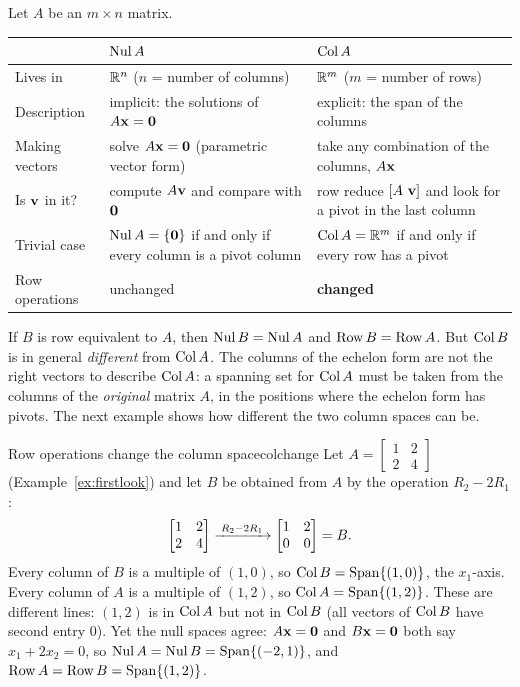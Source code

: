 \documentclass[11pt]{article}
\begin{document}
\begin{remark}
Let $A$ be an $m\times n$ matrix.

\begin{center}
\begin{tabular}{p{1.1in}p{2.2in}p{2.2in}}
\toprule
 & $\operatorname{Nul} A$ & $\operatorname{Col} A$\\
\midrule
Lives in & $\mathbb{R}^n$ ($n$ = number of columns) & $\mathbb{R}^m$ ($m$ = number of rows)\\
Description & implicit: the solutions of $A\mathbf{x}=\mathbf{0}$ & explicit: the span of the columns\\
Making vectors & solve $A\mathbf{x}=\mathbf{0}$ (parametric vector form) & take any combination of the columns, $A\mathbf{x}$\\
Is $\mathbf{v}$ in it? & compute $A\mathbf{v}$ and compare with $\mathbf{0}$ & row reduce $[A\ \bv{v}]$ and look for a pivot in the last column\\
Trivial case & $\operatorname{Nul} A=\{\mathbf{0}\}$ if and only if every column is a pivot column & $\operatorname{Col} A=\mathbb{R}^m$ if and only if every row has a pivot\\
Row operations & unchanged & \textbf{changed}\\
\bottomrule
\end{tabular}
\end{center}
\end{remark}

\begin{warn}
If $B$ is row equivalent to $A$, then $\operatorname{Nul} B=\operatorname{Nul} A$ and $\operatorname{Row} B=\operatorname{Row} A$. But $\operatorname{Col} B$ is in general \emph{different} from $\operatorname{Col} A$. The columns of the echelon form are not the right vectors to describe $\operatorname{Col} A$: a spanning set for $\operatorname{Col} A$ must be taken from the columns of the \emph{original} matrix $A$, in the positions where the echelon form has pivots. The next example shows how different the two column spaces can be.
\end{warn}

\begin{exmp}{Row operations change the column space}{colchange}
Let $A=\begin{bmatrix}1&2\\2&4\end{bmatrix}$ (Example~\ref{ex:firstlook}) and let $B$ be obtained from $A$ by the operation $R_2-2R_1$:
\[
\begin{bmatrix}1&2\\2&4\end{bmatrix}\xrightarrow{\;R_2-2R_1\;}\begin{bmatrix}1&2\\0&0\end{bmatrix}=B.
\]
Every column of $B$ is a multiple of $(1,0)$, so $\operatorname{Col} B=\operatorname{Span}\{(1,0)\}$, the $x_1$-axis. Every column of $A$ is a multiple of $(1,2)$, so $\operatorname{Col} A=\operatorname{Span}\{(1,2)\}$. These are different lines: $(1,2)$ is in $\operatorname{Col} A$ but not in $\operatorname{Col} B$ (all vectors of $\operatorname{Col} B$ have second entry $0$). Yet the null spaces agree: $A\mathbf{x}=\mathbf{0}$ and $B\mathbf{x}=\mathbf{0}$ both say $x_1+2x_2=0$, so $\operatorname{Nul} A=\operatorname{Nul} B=\operatorname{Span}\{(-2,1)\}$, and $\operatorname{Row} A=\operatorname{Row} B=\operatorname{Span}\{(1,2)\}$.
\end{exmp}
\end{document}
